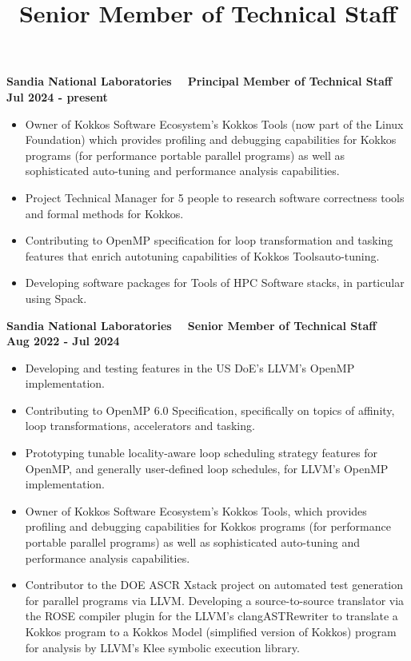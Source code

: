 
\textbf{{Sandia National Laboratories $\>$$\>$$\>$  Principal Member of Technical Staff $\>$$\>$$\>$Jul 2024 - present}} 
\begin{itemize}

	\item Owner of Kokkos Software Ecosystem's Kokkos Tools (now part of the Linux Foundation) which provides profiling and debugging capabilities for Kokkos programs (for performance portable parallel programs) as well as sophisticated auto-tuning and performance analysis capabilities.
	\item Project Technical Manager for 5 people to research software correctness tools and formal methods for Kokkos.  
	\item Contributing to OpenMP specification for loop transformation and tasking features that enrich autotuning capabilities of Kokkos Toolsauto-tuning.   

	\item Developing software packages for Tools of HPC Software stacks, in particular using Spack.
\end{itemize} 
\title{Senior Member of Technical Staff}

\textbf{{Sandia National Laboratories $\>$$\>$$\>$ Senior Member of Technical Staff $\>$$\>$$\>$Aug 2022 - Jul 2024}} 


\begin{itemize}
\item Developing and testing features in the US DoE's LLVM's OpenMP implementation. 
\item Contributing to OpenMP 6.0 Specification, specifically on topics of affinity, loop transformations, accelerators and tasking.
\item Prototyping tunable locality-aware loop scheduling strategy features for OpenMP, and generally user-defined loop schedules, for LLVM's OpenMP implementation.  

\item Owner of Kokkos Software Ecosystem's Kokkos Tools, which provides profiling and debugging capabilities for Kokkos programs (for performance portable parallel programs) as well as sophisticated auto-tuning and performance analysis capabilities.
\item Contributor to the DOE ASCR Xstack project on automated test generation for parallel programs via LLVM. Developing a source-to-source translator via the ROSE compiler plugin for the LLVM's clangASTRewriter to translate a Kokkos program to a Kokkos Model (simplified version of Kokkos) program for analysis by LLVM's Klee symbolic execution library.
\end{itemize}

